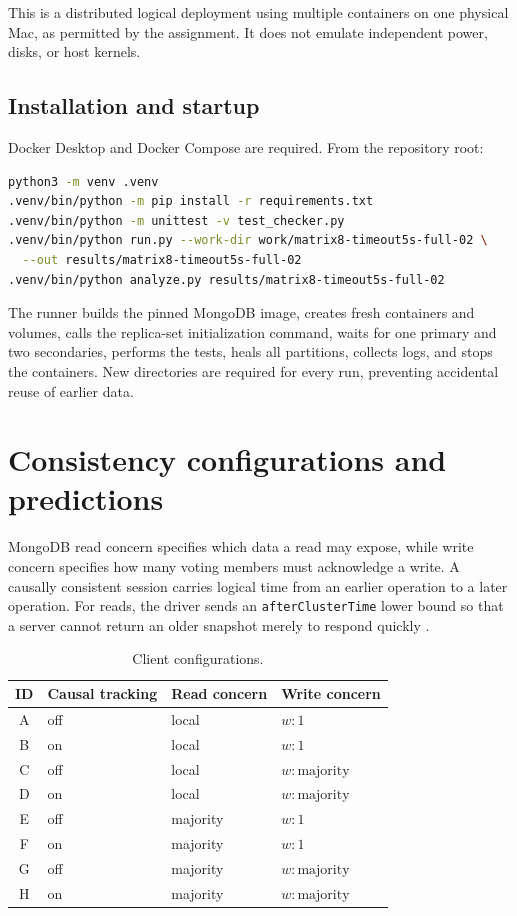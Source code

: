 \documentclass[11pt,a4paper]{article}
\begin{document}
This is a distributed logical deployment using multiple containers on one physical Mac,
as permitted by the assignment. It does not emulate independent power, disks, or host
kernels.

\subsection{Installation and startup}

Docker Desktop and Docker Compose are required. From the repository root:

\begin{lstlisting}[language=bash]
python3 -m venv .venv
.venv/bin/python -m pip install -r requirements.txt
.venv/bin/python -m unittest -v test_checker.py
.venv/bin/python run.py --work-dir work/matrix8-timeout5s-full-02 \
  --out results/matrix8-timeout5s-full-02
.venv/bin/python analyze.py results/matrix8-timeout5s-full-02
\end{lstlisting}

The runner builds the pinned MongoDB image, creates fresh containers and volumes, calls
the replica-set initialization command, waits for one primary and two secondaries, performs the tests,
heals all partitions, collects logs, and stops the containers. New directories are required
for every run, preventing accidental reuse of earlier data.

\section{Consistency configurations and predictions}

MongoDB read concern specifies which data a read may expose, while write concern specifies
how many voting members must acknowledge a write. A causally consistent session carries
logical time from an earlier operation to a later operation. For reads, the driver sends an
\texttt{afterClusterTime} lower bound so that a server cannot return an older snapshot merely
to respond quickly \cite{mongo-causal,pymongo-session}.

\begin{table}[ht]
\centering
\caption{Client configurations.}
\begin{tabular}{@{}clll@{}}
\toprule
ID & Causal tracking & Read concern & Write concern\\
\midrule
A & off & local & $w:1$\\
B & on & local & $w:1$\\
C & off & local & $w:\text{majority}$\\
D & on & local & $w:\text{majority}$\\
E & off & majority & $w:1$\\
F & on & majority & $w:1$\\
G & off & majority & $w:\text{majority}$\\
H & on & majority & $w:\text{majority}$\\
\bottomrule
\end{tabular}
\end{table}
\end{document}
